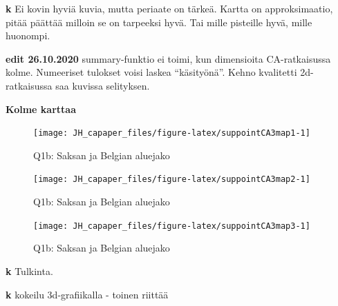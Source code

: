 \documentclass[
  finnish,
]{book}
\newenvironment{Shaded}{\begin{snugshade}}{\end{snugshade}}
\newcommand{\CommentTok}[1]{\textcolor[rgb]{0.56,0.35,0.01}{\textit{#1}}}
\newcommand{\DataTypeTok}[1]{\textcolor[rgb]{0.13,0.29,0.53}{#1}}
\newcommand{\DecValTok}[1]{\textcolor[rgb]{0.00,0.00,0.81}{#1}}
\newcommand{\KeywordTok}[1]{\textcolor[rgb]{0.13,0.29,0.53}{\textbf{#1}}}
\newcommand{\NormalTok}[1]{#1}
\newcommand{\OperatorTok}[1]{\textcolor[rgb]{0.81,0.36,0.00}{\textbf{#1}}}
\newcommand{\StringTok}[1]{\textcolor[rgb]{0.31,0.60,0.02}{#1}}
\begin{document}
\textbf{k} Ei kovin hyviä kuvia, mutta periaate on tärkeä. Kartta on
approksimaatio, pitää päättää milloin se on tarpeeksi hyvä. Tai mille
pisteille hyvä, mille huonompi.

\textbf{edit 26.10.2020} summary-funktio ei toimi, kun dimensioita
CA-ratkaisussa kolme. Numeeriset tulokset voisi laskea ``käsityönä''.
Kehno kvalitetti 2d-ratkaisussa saa kuvissa selityksen.

\begin{Shaded}
\end{Shaded}

\textbf{Kolme karttaa}

\begin{figure}

{\centering \texttt{[image: JH\_capaper\_files/figure-latex/suppointCA3map1-1]} 

}

\caption{Q1b: Saksan ja  Belgian aluejako }\label{fig:suppointCA3map1}
\end{figure}

\begin{figure}

{\centering \texttt{[image: JH\_capaper\_files/figure-latex/suppointCA3map2-1]} 

}

\caption{Q1b: Saksan ja  Belgian aluejako }\label{fig:suppointCA3map2}
\end{figure}

\begin{figure}

{\centering \texttt{[image: JH\_capaper\_files/figure-latex/suppointCA3map3-1]} 

}

\caption{Q1b: Saksan ja  Belgian aluejako }\label{fig:suppointCA3map3}
\end{figure}

\textbf{k} Tulkinta.

\textbf{k} kokeilu 3d-grafiikalla - toinen riittää
\end{document}
